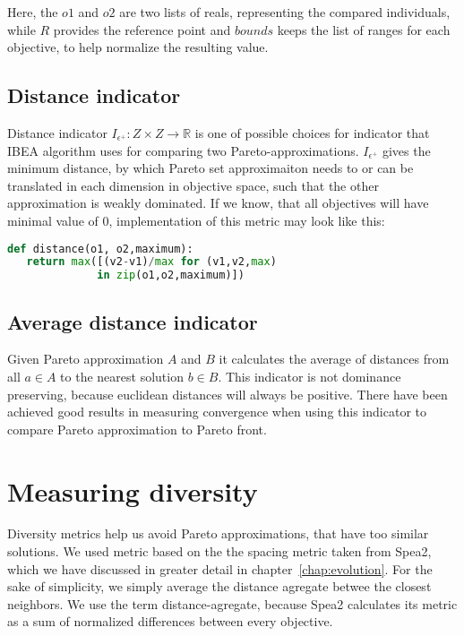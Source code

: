 \documentclass[12pt,oneside]{fithesis2}
\begin{document}
Here, the $o1$ and $o2$ are two lists of reals, representing the compared individuals, while $R$ provides the reference point and $bounds$ keeps the list of ranges for each objective, to help normalize the resulting value.

\subsection{Distance indicator}
Distance indicator $I_{\epsilon^{+}}: Z \times Z \to  \mathbb{R}$ is one of possible choices for indicator that IBEA algorithm uses for comparing two Pareto-approximations. $I_{\epsilon^{+}}$ gives the minimum distance, by which Pareto set approximaiton needs to or can be translated in each dimension in objective space, such that the other approximation is weakly dominated. If we know, that all objectives will have minimal value of 0, implementation of this metric may look like this:

\begin{lstlisting}[language=Python,label=eps_example,caption=Distance indicator implementation]
def distance(o1, o2,maximum):
   return max([(v2-v1)/max for (v1,v2,max) 
              in zip(o1,o2,maximum)])
\end{lstlisting}

\subsection{Average distance indicator}
Given Pareto approximation $A$ and $B$ it calculates the average of distances from all $a \in A$ to the nearest solution $b \in B$. This indicator is not dominance preserving, because euclidean distances will always be positive. There have been achieved good results in measuring convergence when using this indicator to compare Pareto approximation to Pareto front\cite{stehl2013opt}.

\section{Measuring diversity}
Diversity metrics help us avoid Pareto approximations, that have too similar solutions. We used metric based on the the spacing metric taken from Spea2, which we have discussed in greater detail in chapter~\ref{chap:evolution}. For the sake of simplicity, we simply average the distance agregate betwee the closest neighbors. We use the term distance-agregate, because Spea2 calculates its metric as a sum of normalized differences between every objective.
\end{document}
